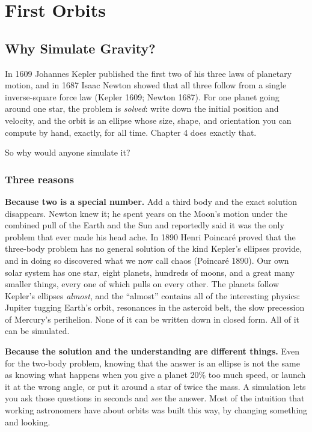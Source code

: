 \documentclass[
  10.5pt,
  letterpaper,
]{scrbook}
\theoremstyle{definition}
\theoremstyle{plain}
\theoremstyle{remark}
\begin{document}
\part{First Orbits}

\chapter{Why Simulate Gravity?}\label{sec-why-simulate}

In 1609 Johannes Kepler published the first two of his three laws of
planetary motion, and in 1687 Isaac Newton showed that all three follow
from a single inverse-square force law (Kepler 1609; Newton 1687). For
one planet going around one star, the problem is \emph{solved}: write
down the initial position and velocity, and the orbit is an ellipse
whose size, shape, and orientation you can compute by hand, exactly, for
all time. Chapter 4 does exactly that.

So why would anyone simulate it?

\section{Three reasons}\label{three-reasons}

\textbf{Because two is a special number.} Add a third body and the exact
solution disappears. Newton knew it; he spent years on the Moon's motion
under the combined pull of the Earth and the Sun and reportedly said it
was the only problem that ever made his head ache. In 1890 Henri
Poincaré proved that the three-body problem has no general solution of
the kind Kepler's ellipses provide, and in doing so discovered what we
now call chaos (Poincaré 1890). Our own solar system has one star, eight
planets, hundreds of moons, and a great many smaller things, every one
of which pulls on every other. The planets follow Kepler's ellipses
\emph{almost}, and the ``almost'' contains all of the interesting
physics: Jupiter tugging Earth's orbit, resonances in the asteroid belt,
the slow precession of Mercury's perihelion. None of it can be written
down in closed form. All of it can be simulated.

\textbf{Because the solution and the understanding are different
things.} Even for the two-body problem, knowing that the answer is an
ellipse is not the same as knowing what happens when you give a planet
20\% too much speed, or launch it at the wrong angle, or put it around a
star of twice the mass. A simulation lets you ask those questions in
seconds and \emph{see} the answer. Most of the intuition that working
astronomers have about orbits was built this way, by changing something
and looking.
\end{document}
